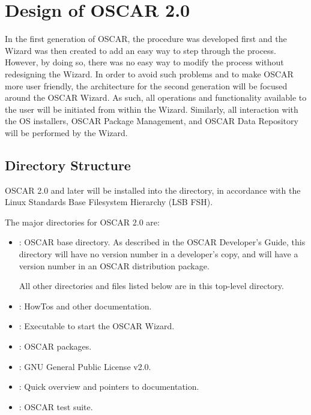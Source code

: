 %
%
%

\section{Design of OSCAR 2.0}

In the first generation of OSCAR, the procedure was developed first
and the Wizard was then created to add an easy way to step through the
process. However, by doing so, there was no easy way to modify the
process without redesigning the Wizard. In order to avoid such
problems and to make OSCAR more user friendly, the architecture for
the second generation will be focused around the OSCAR Wizard. As
such, all operations and functionality available to the user will be
initiated from within the Wizard. Similarly, all interaction with the
OS installers, OSCAR Package Management, and OSCAR Data Repository
will be performed by the Wizard.


\subsection{Directory Structure}

OSCAR 2.0 and later will be installed into the  directory,
in accordance with the Linux Standards Base Filesystem Hierarchy (LSB
FSH).

The major directories for OSCAR 2.0 are:

\begin{itemize}
\item {}: OSCAR base directory.  As described
  in the OSCAR Developer's Guide, this directory will have no version
  number in a developer's copy, and will have a version number in an
  OSCAR distribution package.
  
  All other directories and files listed below are in this top-level
  directory.

\item {}: HowTos and other documentation.

\item {}: Executable to start the OSCAR Wizard.

\item {}: OSCAR packages.

\item {}: GNU General Public License v2.0.
  
\item {}: Quick overview and pointers to documentation.

\item {}: OSCAR test suite.
\end{itemize}

